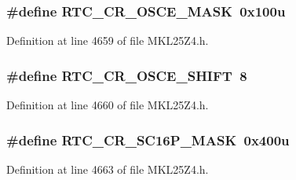 \subsubsection[{\texorpdfstring{R\+T\+C\+\_\+\+C\+R\+\_\+\+O\+S\+C\+E\+\_\+\+M\+A\+SK}{RTC_CR_OSCE_MASK}}]{\setlength{\rightskip}{0pt plus 5cm}\#define R\+T\+C\+\_\+\+C\+R\+\_\+\+O\+S\+C\+E\+\_\+\+M\+A\+SK~0x100u}\hypertarget{group___r_t_c___register___masks_ga1517078d0ce615b7feb94ef57b28e4c8}{}\label{group___r_t_c___register___masks_ga1517078d0ce615b7feb94ef57b28e4c8}


Definition at line 4659 of file M\+K\+L25\+Z4.\+h.

\subsubsection[{\texorpdfstring{R\+T\+C\+\_\+\+C\+R\+\_\+\+O\+S\+C\+E\+\_\+\+S\+H\+I\+FT}{RTC_CR_OSCE_SHIFT}}]{\setlength{\rightskip}{0pt plus 5cm}\#define R\+T\+C\+\_\+\+C\+R\+\_\+\+O\+S\+C\+E\+\_\+\+S\+H\+I\+FT~8}\hypertarget{group___r_t_c___register___masks_ga9d52da825519dde1888921fb1b5e096d}{}\label{group___r_t_c___register___masks_ga9d52da825519dde1888921fb1b5e096d}


Definition at line 4660 of file M\+K\+L25\+Z4.\+h.

\subsubsection[{\texorpdfstring{R\+T\+C\+\_\+\+C\+R\+\_\+\+S\+C16\+P\+\_\+\+M\+A\+SK}{RTC_CR_SC16P_MASK}}]{\setlength{\rightskip}{0pt plus 5cm}\#define R\+T\+C\+\_\+\+C\+R\+\_\+\+S\+C16\+P\+\_\+\+M\+A\+SK~0x400u}\hypertarget{group___r_t_c___register___masks_ga885a0abaf0aeae2525406950542df145}{}\label{group___r_t_c___register___masks_ga885a0abaf0aeae2525406950542df145}


Definition at line 4663 of file M\+K\+L25\+Z4.\+h.

